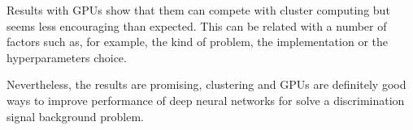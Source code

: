 \documentclass[ twoside,openright,titlepage,numbers=noenddot,%
 headinclude,footinclude,cleardoublepage=empty,abstract=on,
 BCOR=5mm,paper=a4,fontsize=11pt
]{scrreprt}
\theoremstyle{plain}
\begin{document}
Results with GPUs show that them can compete with cluster computing but seems
less encouraging than expected. This can be related with a number of factors such
as, for example, the kind of problem, the implementation or the hyperparameters choice.

Nevertheless, the results are promising, clustering and GPUs are definitely good
ways to improve performance of deep neural networks for solve a discrimination signal background problem.

\appendix
\cleardoublepage
\end{document}
